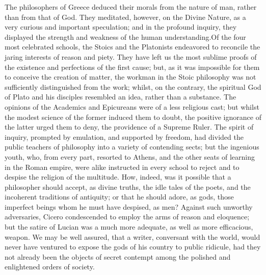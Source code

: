 
The philosophers of Greece deduced their morals from the nature
of man, rather than from that of God. They meditated, however, on
the Divine Nature, as a very curious and important speculation;
and in the profound inquiry, they displayed the strength and
weakness of the human understanding.\footnotemark[6] Of the four most
celebrated schools, the Stoics and the Platonists endeavored to
reconcile the jaring interests of reason and piety. They have
left us the most sublime proofs of the existence and perfections
of the first cause; but, as it was impossible for them to
conceive the creation of matter, the workman in the Stoic
philosophy was not sufficiently distinguished from the work;
whilst, on the contrary, the spiritual God of Plato and his
disciples resembled an idea, rather than a substance. The
opinions of the Academics and Epicureans were of a less religious
cast; but whilst the modest science of the former induced them to
doubt, the positive ignorance of the latter urged them to deny,
the providence of a Supreme Ruler. The spirit of inquiry,
prompted by emulation, and supported by freedom, had divided the
public teachers of philosophy into a variety of contending sects;
but the ingenious youth, who, from every part, resorted to
Athens, and the other seats of learning in the Roman empire, were
alike instructed in every school to reject and to despise the
religion of the multitude. How, indeed, was it possible that a
philosopher should accept, as divine truths, the idle tales of
the poets, and the incoherent traditions of antiquity; or that he
should adore, as gods, those imperfect beings whom he must have
despised, as men? Against such unworthy adversaries, Cicero
condescended to employ the arms of reason and eloquence; but the
satire of Lucian was a much more adequate, as well as more
efficacious, weapon. We may be well assured, that a writer,
conversant with the world, would never have ventured to expose
the gods of his country to public ridicule, had they not already
been the objects of secret contempt among the polished and
enlightened orders of society.\footnotemark[7]


